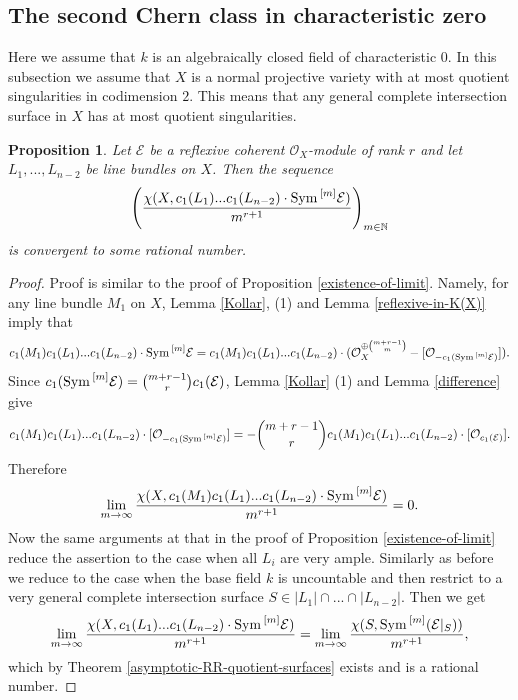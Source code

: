 \documentclass[twoside, 11pt]{article}
\theoremstyle{plain}
\newtheorem{Proposition}[Thm]{\sc Proposition}
\theoremstyle{definition}
\theoremstyle{remark}
\newcommand{\NN}{{\mathbb N}}
\newcommand{\cE}{{\mathcal E}}
\newcommand{\cO}{{\mathcal O}}
\newcommand{\Sym}{{\mathop{{\rm Sym \, }}}}
\begin{document}
\subsection{The second Chern class in characteristic zero}

Here we assume that $k$ is an algebraically closed field of characteristic $0$. In this subsection we assume that
$X$ is a normal projective variety  with at most quotient singularities in codimension $2$. This means that any general complete intersection surface in $X$ has  at most quotient singularities.

\begin{Proposition}\label{ch_2-char0}
Let $\cE$ be a reflexive coherent $\cO_X$-module of rank $r$ and let $L_1,..., L_{n-2}$ be line bundles on $X$.
Then the sequence
 $$\left(\frac {  \chi (X, c_1(L_1)...c_1(L_{n-2}) \cdot {\Sym ^{[m]} \cE} ) }{m^{r+1}} \right)_{m\in \NN}$$
 is convergent to some rational number. 
\end{Proposition}

\begin{proof}
Proof is similar to the proof of Proposition \ref{existence-of-limit}.
Namely, for any line bundle $M_1$ on $X$, Lemma \ref{Kollar}, (1) and Lemma \ref{reflexive-in-K(X)} imply that
$$c_1(M_1)c_1(L_1)...c_1(L_{n-2}) \cdot {\Sym^{[m]}\cE} =c_1(M_1)c_1(L_1)...c_1(L_{n-2}) \cdot 
(\cO_X^{\oplus \binom{m+r-1}{m} }-[\cO_{ -c_1(\Sym^{[m]}\cE )}] ) .$$
Since $c_1(\Sym^{[m]}\cE ) =\binom{m+r-1}{r}c_1 (\cE)$, Lemma \ref{Kollar} (1) and Lemma \ref{difference} give 
$$c_1(M_1)c_1(L_1)...c_1(L_{n-2}) \cdot  [\cO_{ -c_1(\Sym^{[m]}\cE )}] =-\binom{m+r-1}{r}c_1(M_1)c_1(L_1)...c_1(L_{n-2}) \cdot [\cO_{c_1 (\cE)}].$$
Therefore
$$ \lim_{m\to \infty} \frac {  \chi (X, c_1(M_1) c_1(L_1)...c_1(L_{n-2}) \cdot {\Sym ^{[m]} \cE} ) }{m^{r+1}} =0.$$
Now the same arguments at that in  the proof of Proposition \ref{existence-of-limit} reduce the assertion to the case when all $L_i$ are very ample. Similarly as before we reduce to the case when the base field $k$ is uncountable and
then restrict to a very general complete intersection surface $S\in |L_1|\cap ...\cap |L_{n-2}|$. Then we get
$$\lim _{m\to \infty }\frac {  \chi (X, c_1(L_1)...c_1(L_{n-2}) \cdot {\Sym^{[m]}\cE}  ) }{m^{r+1}}=\lim _{m\to \infty}\frac{\chi(S, \Sym^{[m]} (\cE |_S )) }{m^{r+1}},$$ 
which by Theorem \ref{asymptotic-RR-quotient-surfaces} exists and is a rational number.
\end{proof}

\medskip
\end{document}
